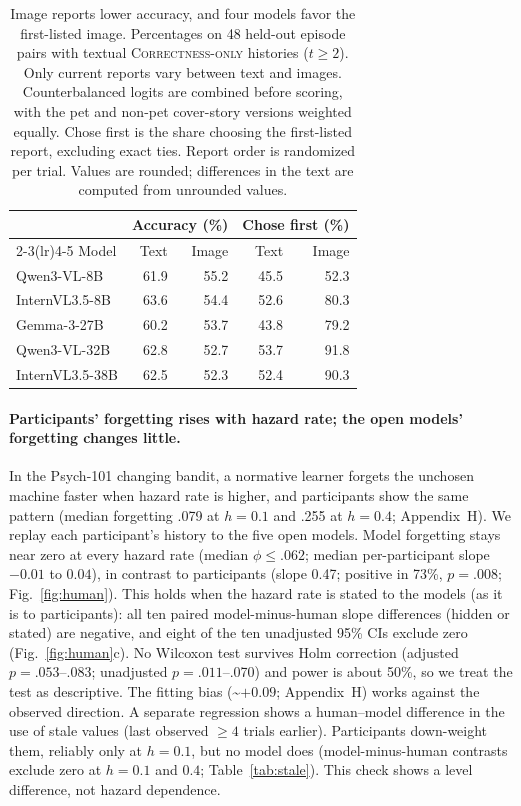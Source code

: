 \documentclass[letterpaper]{article} %
\newcommand{\CorrectnessOnly}{\textsc{Correctness-only}}
\begin{document}
\begin{table}[t]\centering\small
  \setlength{\tabcolsep}{3pt}
  \begin{tabular}{l rrrr}
    \toprule
    & \multicolumn{2}{c}{Accuracy (\%)} & \multicolumn{2}{c}{Chose first (\%)} \\
    \cmidrule(lr){2-3}\cmidrule(lr){4-5}
    Model & Text & Image & Text & Image \\
    \midrule
    Qwen3-VL-8B & 61.9 & 55.2 & 45.5 & 52.3 \\
    InternVL3.5-8B & 63.6 & 54.4 & 52.6 & 80.3 \\
    Gemma-3-27B & 60.2 & 53.7 & 43.8 & 79.2 \\
    Qwen3-VL-32B & 62.8 & 52.7 & 53.7 & 91.8 \\
    InternVL3.5-38B & 62.5 & 52.3 & 52.4 & 90.3 \\
    \bottomrule
  \end{tabular}
  \caption{Image reports lower accuracy, and four models favor the first-listed image. Percentages on 48 held-out episode pairs with textual \CorrectnessOnly{} histories ($t\ge2$). Only current reports vary between text and images. Counterbalanced logits are combined before scoring, with the pet and non-pet cover-story versions weighted equally. Chose first is the share choosing the first-listed report, excluding exact ties. Report order is randomized per trial. Values are rounded; differences in the text are computed from unrounded values.}
  \label{tab:mm}
\end{table}

\paragraph{Participants' forgetting rises with hazard rate; the open models' forgetting changes little.} In the Psych-101 changing bandit, a normative learner forgets the unchosen machine faster when hazard rate is higher, and participants show the same pattern (median forgetting .079 at $h=0.1$ and .255 at $h=0.4$; Appendix~H). We replay each participant's history to the five open models. Model forgetting stays near zero at every hazard rate (median $\phi\le .062$; median per-participant slope $-0.01$ to $0.04$), in contrast to participants (slope 0.47; positive in 73\%, $p=.008$; Fig.~\ref{fig:human}). This holds when the hazard rate is stated to the models (as it is to participants): all ten paired model-minus-human slope differences (hidden or stated) are negative, and eight of the ten unadjusted 95\% CIs exclude zero (Fig.~\ref{fig:human}c). No Wilcoxon test survives Holm correction (adjusted $p=.053$--.083; unadjusted $p=.011$--.070) and power is about 50\%, so we treat the test as descriptive. The fitting bias (\mbox{\textasciitilde}$+0.09$; Appendix~H) works against the observed direction. A separate regression shows a human--model difference in the use of stale values (last observed $\ge4$ trials earlier). Participants down-weight them, reliably only at $h=0.1$, but no model does (model-minus-human contrasts exclude zero at $h=0.1$ and $0.4$; Table~\ref{tab:stale}). This check shows a level difference, not hazard dependence.
\end{document}
